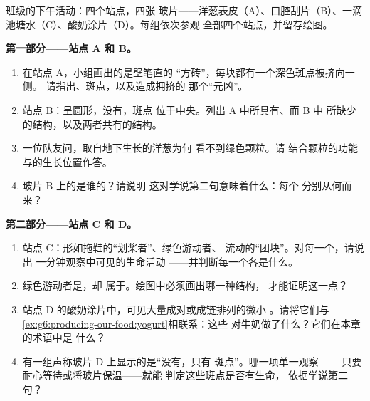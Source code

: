 \begin{problem}\label{pb:g6:cell-unit-of-life:1}
班级的下午活动：四个站点，四张
玻片——洋葱表皮（A）、口腔刮片（B）、一滴
池塘水（C）、酸奶涂片（D）。每组依次参观
全部四个站点，并留存绘图。

\medskip\noindent\textbf{第一部分——站点 A 和 B。}
\begin{enumerate}
  \item 在站点 A，小组画出的是壁笔直的
        “方砖”，每块都有一个深色斑点被挤向一侧。
        请指出、斑点，以及造成拥挤的
        那个“元凶”。
  \item 站点 B：呈圆形，没有，斑点
        位于中央。列出 A 中所具有、而 B 中
        所缺少的结构，以及两者共有的结构。
  \item 一位队友问，取自地下生长的洋葱为何
        看不到绿色颗粒。请
        结合颗粒的功能与的生长位置作答。
  \item 玻片 B 上的是谁的？请说明
        这对学说第二句意味着什么：每个
        分别从何而来？
\end{enumerate}

\medskip\noindent\textbf{第二部分——站点 C 和 D。}
\begin{enumerate}[resume]
  \item 站点 C：形如拖鞋的“划桨者”、绿色游动者、
        流动的“团块”。对每一个，请说出
        一分钟观察中可见的生命活动
——并判断每一个各是什么。
  \item 绿色游动者是，却
        属于。绘图中必须画出哪一种结构，
        才能证明这一点？
  \item 站点 D 的酸奶涂片中，可见大量成对或成链排列的微小
        。请将它们与
        \cref{ex:g6:producing-our-food:yogurt}相联系：这些
        对牛奶做了什么？它们在本章的术语中是
        什么？
  \item 有一组声称玻片 D 上显示的是“没有，只有
        斑点”。哪一项单一观察
——只要耐心等待或将玻片保温——就能
        判定这些斑点是否有生命，
        依据学说第二句？
\end{enumerate}


\end{problem}
